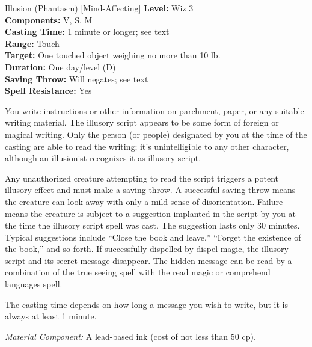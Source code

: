 {Illusion (Phantasm) [Mind-Affecting]}
{
	\textbf{Level:}
	Wiz 3\\
	\textbf{Components:}
	V, S, M\\
	\textbf{Casting Time:}
	1 minute or longer; see text\\
	\textbf{Range:}
	Touch\\
	\textbf{Target:}
	One touched object weighing no more than 10 lb.\\
	\textbf{Duration:}
	One day/level (D)\\
	\textbf{Saving Throw:}
	Will negates; see text\\
	\textbf{Spell Resistance:}
	Yes\\
}
{
	You write instructions or other information on parchment, paper, or any suitable writing material. The illusory script appears to be some form of foreign or magical writing. Only the person (or people) designated by you at the time of the casting are able to read the writing; it's unintelligible to any other character, although an illusionist recognizes it as illusory script.

	Any unauthorized creature attempting to read the script triggers a potent illusory effect and must make a saving throw. A successful saving throw means the creature can look away with only a mild sense of disorientation. Failure means the creature is subject to a suggestion implanted in the script by you at the time the illusory script spell was cast. The suggestion lasts only 30 minutes. Typical suggestions include ``Close the book and leave,'' ``Forget the existence of the book,'' and so forth. If successfully dispelled by dispel magic, the illusory script and its secret message disappear. The hidden message can be read by a combination of the true seeing spell with the read magic or comprehend languages spell.

	The casting time depends on how long a message you wish to write, but it is always at least 1 minute.

	\textit{Material Component:}
	A lead-based ink (cost of not less than 50 cp).

}
